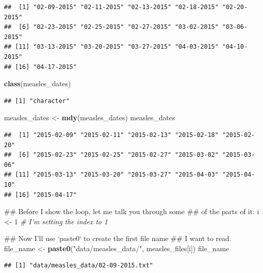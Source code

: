 \documentclass[]{book}
\makeatletter
\newenvironment{Shaded}{\begin{snugshade}}{\end{snugshade}}
\newcommand{\KeywordTok}[1]{\textcolor[rgb]{0.13,0.29,0.53}{\textbf{#1}}}
\newcommand{\DecValTok}[1]{\textcolor[rgb]{0.00,0.00,0.81}{#1}}
\newcommand{\StringTok}[1]{\textcolor[rgb]{0.31,0.60,0.02}{#1}}
\newcommand{\CommentTok}[1]{\textcolor[rgb]{0.56,0.35,0.01}{\textit{#1}}}
\newcommand{\NormalTok}[1]{#1}
\newenvironment{kframe}{%
\medskip{}
\setlength{\fboxsep}{.8em}
 \def\at@end@of@kframe{}%
 \ifinner\ifhmode%
  \def\at@end@of@kframe{\end{minipage}}%
  \begin{minipage}{\columnwidth}%
 \fi\fi%
 \def\FrameCommand##1{\hskip\@totalleftmargin \hskip-\fboxsep
 \colorbox{shadecolor}{##1}\hskip-\fboxsep
     \hskip-\linewidth \hskip-\@totalleftmargin \hskip\columnwidth}%
 \MakeFramed {\advance\hsize-\width
   \@totalleftmargin\z@ \linewidth\hsize
   \@setminipage}}%
 {\par\unskip\endMakeFramed%
 \at@end@of@kframe}
\renewenvironment{Shaded}{\begin{kframe}}{\end{kframe}}
\theoremstyle{definition}
\theoremstyle{definition}
\theoremstyle{definition}
\theoremstyle{remark}
\makeatother
\begin{document}
\begin{verbatim}
##  [1] "02-09-2015" "02-11-2015" "02-13-2015" "02-18-2015" "02-20-2015"
##  [6] "02-23-2015" "02-25-2015" "02-27-2015" "03-02-2015" "03-06-2015"
## [11] "03-13-2015" "03-20-2015" "03-27-2015" "04-03-2015" "04-10-2015"
## [16] "04-17-2015"
\end{verbatim}

\begin{Shaded}
\begin{Highlighting}[]
\KeywordTok{class}\NormalTok{(measles_dates)}
\end{Highlighting}
\end{Shaded}

\begin{verbatim}
## [1] "character"
\end{verbatim}

\begin{Shaded}
\begin{Highlighting}[]
\NormalTok{measles_dates <-}\StringTok{ }\KeywordTok{mdy}\NormalTok{(measles_dates)}
\NormalTok{measles_dates}
\end{Highlighting}
\end{Shaded}

\begin{verbatim}
##  [1] "2015-02-09" "2015-02-11" "2015-02-13" "2015-02-18" "2015-02-20"
##  [6] "2015-02-23" "2015-02-25" "2015-02-27" "2015-03-02" "2015-03-06"
## [11] "2015-03-13" "2015-03-20" "2015-03-27" "2015-04-03" "2015-04-10"
## [16] "2015-04-17"
\end{verbatim}

\begin{Shaded}
\begin{Highlighting}[]
\NormalTok{## Before I show the loop, let me talk you through some }
\NormalTok{## of the parts of it:}
\NormalTok{i <-}\StringTok{ }\DecValTok{1} \CommentTok{# I'm setting the index to 1}

\NormalTok{## Now I'll use `paste0` to create the first file name}
\NormalTok{## I want to read.}
\NormalTok{file_name <-}\StringTok{ }\KeywordTok{paste0}\NormalTok{(}\StringTok{"data/measles_data/"}\NormalTok{, measles_files[i])}
\NormalTok{file_name}
\end{Highlighting}
\end{Shaded}

\begin{verbatim}
## [1] "data/measles_data/02-09-2015.txt"
\end{verbatim}
\end{document}
